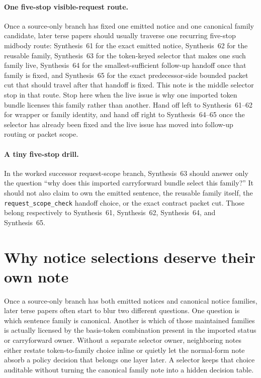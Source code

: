 \documentclass[11pt]{article}
\begin{document}
\paragraph{One five-stop visible-request route.}
Once a source-only branch has fixed one emitted notice and one canonical family candidate, later terse papers should usually traverse one recurring five-stop midbody route: Synthesis~61 for the exact emitted notice, Synthesis~62 for the reusable family, Synthesis~63 for the token-keyed selector that makes one such family live, Synthesis~64 for the smallest-sufficient follow-up handoff once that family is fixed, and Synthesis~65 for the exact predecessor-side bounded packet cut that should travel after that handoff is fixed. This note is the middle selector stop in that route. Stop here when the live issue is why one imported token bundle licenses this family rather than another. Hand off left to Synthesis~61--62 for wrapper or family identity, and hand off right to Synthesis~64--65 once the selector has already been fixed and the live issue has moved into follow-up routing or packet scope.

\paragraph{A tiny five-stop drill.}
In the worked successor request-scope branch, Synthesis~63 should answer only the question ``why does this imported carryforward bundle select this family?'' It should not also claim to own the emitted sentence, the reusable family itself, the \nolinkurl{request_scope_check} handoff choice, or the exact contract packet cut. Those belong respectively to Synthesis~61, Synthesis~62, Synthesis~64, and Synthesis~65.

\section{Why notice selections deserve their own note}
Once a source-only branch has both emitted notices and canonical notice families, later terse papers often start to blur two different questions.
One question is which sentence family is canonical.
Another is which of those maintained families is actually licensed by the basis-token combination present in the imported status or carryforward owner.
Without a separate selector owner, neighboring notes either restate token-to-family choice inline or quietly let the normal-form note absorb a policy decision that belongs one layer later.
A selector keeps that choice auditable without turning the canonical family note into a hidden decision table.
\end{document}
